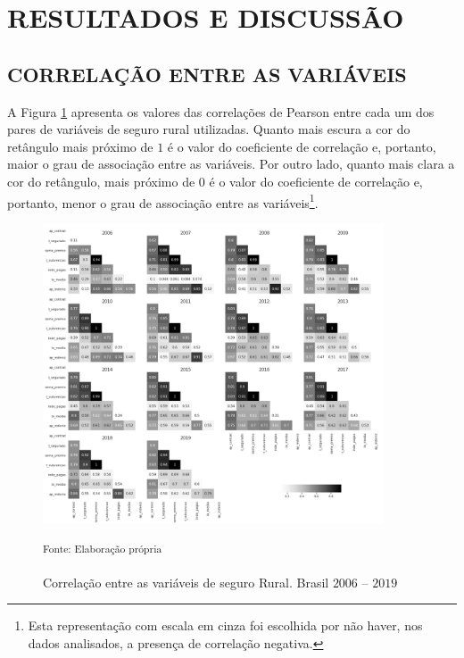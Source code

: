 

\section{RESULTADOS E DISCUSSÃO}\label{sc-results}

\subsection{CORRELAÇÃO ENTRE AS VARIÁVEIS} 

A Figura \ref{corr_anos} apresenta os valores das correlações de Pearson entre cada um dos pares de variáveis de seguro rural utilizadas. Quanto mais escura a cor do retângulo mais próximo de $1$ é o valor do coeficiente de correlação e, portanto, maior o grau de associação entre as variáveis. Por outro lado, quanto mais clara a cor do retângulo, mais próximo de $0$ é o valor do coeficiente de correlação e, portanto, menor o grau de associação entre as variáveis\footnote{Esta representação com escala em cinza foi escolhida por não haver, nos dados analisados, a presença de correlação negativa.}.

\begin{figure}[H]
	\centering
	\caption{Correlação entre as variáveis de seguro Rural. Brasil $2006$ -- $2019$}
	\includegraphics[width=0.9\textwidth]{figuras/corr_anos_bw.png}
	\parbox{\dimexpr\linewidth-2cm}{\raggedright
    \strut \textsuperscript{Fonte: Elaboração própria}\strut}
    \label{corr_anos}
\end{figure}

